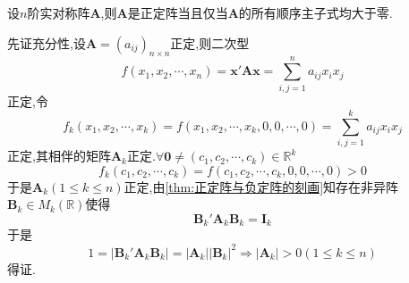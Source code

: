 \begin{formal}
    \begin{theorem}[正定阵的判定]\label{thm:正定阵的判定}
        设$n$阶实对称阵$\bm{A}$,则$\bm{A}$是正定阵当且仅当$\bm{A}$的所有顺序主子式均大于零.
    \end{theorem}
    \begin{Proof}
        先证充分性,设$\bm{A}=\left(a_{ij}\right)_{n\times n}$正定,则二次型\[
        f\left(
            x_1,x_2,\cdots,x_n
        \right)=\bm{x}'\bm{Ax}=\sum_{i,j=1}^{n}a_{ij}x_ix_j
        \]正定,令\[
        f_k\left(
            x_1,x_2,\cdots,x_k
        \right)=f\left(
            x_1,x_2,\cdots,x_k,0,0,\cdots,0
        \right)=\sum_{i,j=1}^{k}a_{ij}x_ix_j
        \]正定,其相伴的矩阵$\bm{A}_k$正定.$\forall\bm{0}\neq\left(c_1,c_2,\cdots,c_k\right)\in\mathbb{R}^k$\[
        f_k\left(
            c_1,c_2,\cdots,c_k
        \right)=f\left(
            c_1,c_2,\cdots,c_k,0,0,\cdots,0
        \right)>0
        \]于是$\bm{A}_k\left(
            1\leqslant k\leqslant n
        \right)$正定,由\cref{thm:正定阵与负定阵的刻画}知存在非异阵$\bm{B}_k\in M_k\left(\mathbb{R}\right) $使得\[
        \bm{B}_k'\bm{A}_k\bm{B}_k=\bm{I}_k
        \]于是\[
        1=\left|
            \bm{B}_k'\bm{A}_k\bm{B}_k
        \right|=|\bm{A}_k|\left|\bm{B}_k\right|^2\Longrightarrow\left|\bm{A}_k\right|>0\left(
            1\leqslant k\leqslant n
        \right)
        \]得证.


\end{Proof}
\end{formal}
